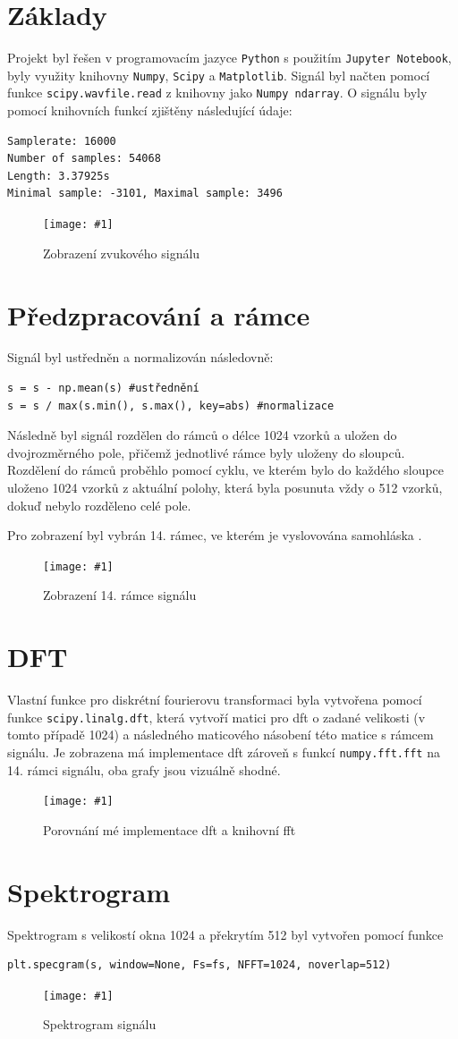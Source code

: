 \documentclass[11pt]{article}
\newcommand{\pic}[2]{
    \begin{figure}[h!]
    \centering
    \texttt{[image: \#1]}
    \caption{#2}
    \end{figure}
}
\begin{document}
\section{Základy}
Projekt byl řešen v programovacím jazyce \texttt{Python} s použitím \texttt{Jupyter Notebook}, byly využity knihovny \texttt{Numpy}, \texttt{Scipy} a \texttt{Matplotlib}.
Signál byl načten pomocí funkce \texttt{scipy.wavfile.read} z knihovny jako \texttt{Numpy ndarray}. 
O signálu byly pomocí knihovních funkcí zjištěny následující údaje:
\begin{verbatim}
Samplerate: 16000
Number of samples: 54068
Length: 3.37925s
Minimal sample: -3101, Maximal sample: 3496
\end{verbatim}
\pic{img/1_signal.png}{Zobrazení zvukového signálu}

\section{Předzpracování a rámce}
Signál byl ustředněn a normalizován následovně:
\begin{verbatim}
s = s - np.mean(s) #ustřednění
s = s / max(s.min(), s.max(), key=abs) #normalizace
\end{verbatim}

Následně byl signál rozdělen do rámců o délce 1024 vzorků a uložen do dvojrozměrného pole, přičemž jednotlivé rámce byly uloženy do sloupců.
Rozdělení do rámců proběhlo pomocí cyklu, ve kterém bylo do každého sloupce uloženo 1024 vzorků z aktuální polohy, která byla posunuta vždy o 512 vzorků, dokuď nebylo rozděleno celé pole.

Pro zobrazení byl vybrán 14. rámec, ve kterém je vyslovována samohláska .
\pic{img/2_frame.png}{Zobrazení 14. rámce signálu}

\section{DFT}
Vlastní funkce pro diskrétní fourierovu transformaci byla vytvořena pomocí funkce \texttt{scipy.linalg.dft}, která vytvoří matici pro dft o zadané velikosti (v tomto případě 1024) a následného maticového násobení této matice s rámcem signálu. 
Je zobrazena má implementace dft zároveň s funkcí \texttt{numpy.fft.fft} na 14. rámci signálu, oba grafy jsou vizuálně shodné.
\pic{img/3_dft.png}{Porovnání mé implementace dft a knihovní fft}

\section{Spektrogram}
Spektrogram s velikostí okna 1024 a překrytím 512 byl vytvořen pomocí funkce
\begin{verbatim}
plt.specgram(s, window=None, Fs=fs, NFFT=1024, noverlap=512)
\end{verbatim}
\pic{img/4_spectrograph.png}{Spektrogram signálu}
\end{document}
